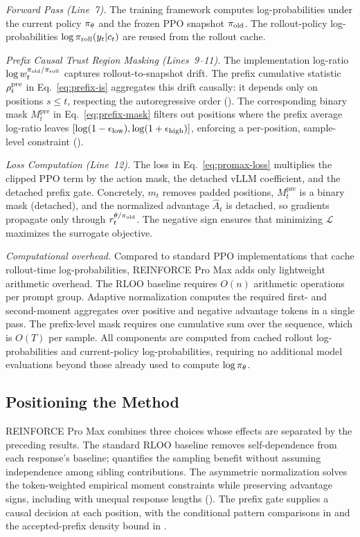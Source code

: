 \emph{Forward Pass (Line~7).} The training framework computes log-probabilities under the current policy $\pi_{\theta}$ and the frozen PPO
snapshot $\pi_{\mathrm{old}}$. The rollout-policy log-probabilities $\log\pi_{\mathrm{roll}}(y_t|c_t)$ are reused from the rollout cache.

\emph{Prefix Causal Trust Region Masking (Lines~9--11).} The implementation log-ratio
$\log w_t^{\pi_{\mathrm{old}}/\pi_{\mathrm{roll}}}$ captures rollout-to-snapshot drift. The prefix
cumulative statistic $\rho_{t}^{\mathrm{pre}}$ in Eq.~\eqref{eq:prefix-is} aggregates
this drift causally: it depends only on positions $s\le t$, respecting the
autoregressive order (). The corresponding binary mask
$M_t^{\mathrm{pre}}$ in Eq.~\eqref{eq:prefix-mask} filters out positions where the prefix average log-ratio leaves
$[\log(1-\epsilon_{\mathrm{low}}),\log(1+\epsilon_{\mathrm{high}})]$, enforcing a per-position, sample-level constraint ().

\emph{Loss Computation (Line~12).} The loss in Eq.~\eqref{eq:promax-loss} multiplies the clipped PPO term by the action mask, the
detached vLLM coefficient, and the detached prefix gate. Concretely, $m_t$ removes padded positions, $M_t^{\mathrm{pre}}$ is a
binary mask (detached), and the normalized
advantage $\hat{A}_t$ is detached, so gradients propagate only through
$r_t^{\theta/\pi_{\mathrm{old}}}$. The negative sign ensures that minimizing
$\mathcal{L}$ maximizes the surrogate objective.

\emph{Computational overhead.} Compared to standard PPO implementations that cache rollout-time log-probabilities, REINFORCE Pro Max adds
only lightweight arithmetic overhead. The RLOO baseline requires $O(n)$ arithmetic operations per prompt group. Adaptive normalization
computes the required first- and second-moment aggregates over positive and negative advantage tokens in a single pass. The prefix-level
mask requires one cumulative sum over the sequence,
which is $O(T)$ per sample. All components are computed from cached rollout log-probabilities and current-policy log-probabilities,
requiring no additional model evaluations beyond those already used to compute $\log\pi_{\theta}$.

\subsection{Positioning the Method}

REINFORCE Pro Max combines three choices whose effects are separated by the
preceding results. The standard RLOO baseline removes self-dependence from
each response's baseline;  quantifies the
sampling benefit without assuming independence among sibling contributions.
The asymmetric normalization solves the token-weighted empirical moment
constraints while preserving advantage signs, including with unequal
response lengths ().
The prefix gate supplies a causal decision at each position, with the
conditional pattern comparisons in  and the
accepted-prefix density bound in .

